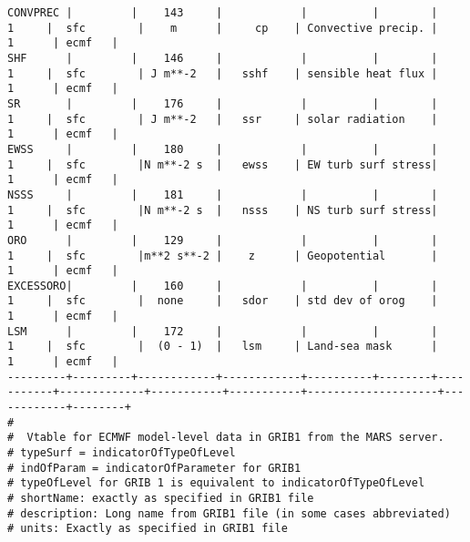 \documentclass{egu}                  %
\begin{document}
\begin{landscape}
\begin{scriptsize}
\begin{verbatim}
CONVPREC |         |    143     |            |          |        |     1     |  sfc        |    m      |     cp    | Convective precip. |     1      | ecmf   |
SHF      |         |    146     |            |          |        |     1     |  sfc        | J m**-2   |   sshf    | sensible heat flux |     1      | ecmf   |
SR       |         |    176     |            |          |        |     1     |  sfc        | J m**-2   |   ssr     | solar radiation    |     1      | ecmf   |
EWSS     |         |    180     |            |          |        |     1     |  sfc        |N m**-2 s  |   ewss    | EW turb surf stress|     1      | ecmf   |
NSSS     |         |    181     |            |          |        |     1     |  sfc        |N m**-2 s  |   nsss    | NS turb surf stress|     1      | ecmf   |
ORO      |         |    129     |            |          |        |     1     |  sfc        |m**2 s**-2 |    z      | Geopotential       |     1      | ecmf   |
EXCESSORO|         |    160     |            |          |        |     1     |  sfc        |  none     |   sdor    | std dev of orog    |     1      | ecmf   |
LSM      |         |    172     |            |          |        |     1     |  sfc        |  (0 - 1)  |   lsm     | Land-sea mask      |     1      | ecmf   |
---------+---------+------------+------------+----------+--------+-----------+-------------+-----------+-----------+--------------------+------------+--------+
#
#  Vtable for ECMWF model-level data in GRIB1 from the MARS server.
# typeSurf = indicatorOfTypeOfLevel
# indOfParam = indicatorOfParameter for GRIB1
# typeOfLevel for GRIB 1 is equivalent to indicatorOfTypeOfLevel
# shortName: exactly as specified in GRIB1 file
# description: Long name from GRIB1 file (in some cases abbreviated)
# units: Exactly as specified in GRIB1 file

\end{verbatim}\end{scriptsize}

\end{landscape} 
\end{document}
